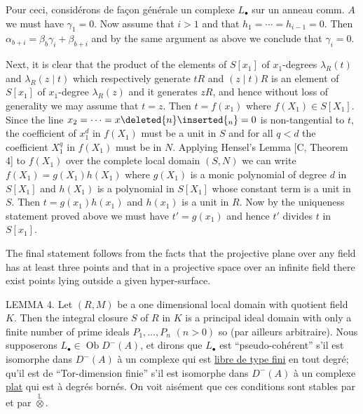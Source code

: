 Pour ceci, considérons de façon générale un complexe $L_\bullet$ sur un anneau comm. $A$
we must have $\gamma_1=0$. Now assume that $i>1$ and that $h_1=\cdots=h_{i-1}=0$. Then $\alpha_{b+i}=\beta_b\gamma_i+\beta_{b+i}$ and by the same argument as above we conclude that $\gamma_i=0$.

Next, it is clear that the product of the elements of $S[x_1]$ of $x_1$-degrees $\lambda_R(t)$ and $\lambda_R(z\mid t)$ which respectively generate $tR$ and $(z\mid t)R$ is an element of $S[x_1]$ of $x_1$-degree $\lambda_R(z)$ and it generates $zR$, and hence without loss of generality we may assume that $t=z$. Then $t=f(x_1)$ where $f(X_1)\in S[X_1]$. Since the line $x_2=\cdots=x\deleted{n}\inserted{{}_n}=0$ is non-tangential to $t$, the coefficient of $x_1^d$ in $f(X_1)$ must be a unit in $S$ and for all $q<d$ the coefficient  $X_1^q$ in $f(X_1)$ must be in $N$. Applying Hensel's Lemma [C, Theorem 4] to $f(X_1)$ over the complete local domain $(S,N)$ we can write $f(X_1)=g(X_1)h(X_1)$ where $g(X_1)$ is a monic polynomial of degree $d$ in $S[X_1]$ and $h(X_1)$ is a polynomial in $S[X_1]$ whose constant term is a unit in $S$. Then $t=g(x_1)h(x_1)$ and $h(x_1)$ is a unit in $R$. Now by the uniqueness statement proved above we must have $t'=g(x_1)$ and hence $t'$ divides $t$ in $S[x_1]$.

The final statement follows from the facts that the projective plane over any field has at least three points and that in a projective space over an infinite field there exist points lying outside a given hyper-surface.

LEMMA 4. Let $(R,M)$ be a one dimensional local domain with quotient field $K$. Then the integral closure $S$ of $R$ in $K$ is a principal ideal domain with only a finite number of prime ideals $P_1,\ldots,P_n$ $(n>0)$ so
(par ailleurs arbitraire). Nous supposerons $L_\bullet\in\operatorname{Ob}D^-(A)$, et dirons que $L_\bullet$ est ``pseudo-cohérent'' s'il est isomorphe dans $D^-(A)$ à un complexe qui est \uline{libre de type fini} en tout degré;   qu'il est de ``Tor-dimension finie'' s'il est isomorphe dans $D^-(A)$ à un complexe \uline{plat} qui est  à degrés bornés. On voit aisément que ces conditions sont stables par  et par $\overset{\mathbb L}{\otimes}$.

